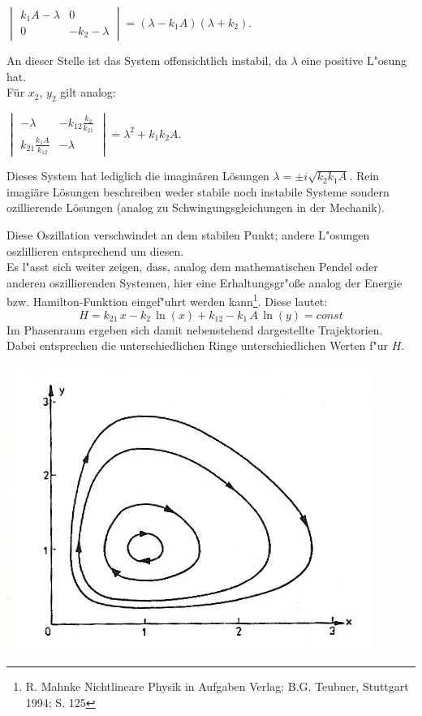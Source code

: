 \documentclass[11pt]{article}
\begin{document}
$\begin{vmatrix} k_1 A -\lambda & 0 \\ 0 & -k_2-\lambda \end{vmatrix}=(\lambda-k_1A)(\lambda+k_2)$.\\
\vspace{3mm}

An dieser Stelle ist das System offensichtlich instabil, da $\lambda$ eine positive L"osung hat.\\
Für $x_2$, $y_2$ gilt analog:\\
\vspace{3mm}

$\begin{vmatrix} -\lambda & -k_{12}\frac{k_2}{k_21} \\ k_{21}\frac{k_1 A}{k_12} & -\lambda \end{vmatrix}=\lambda^2+k_1k_2A$.\\
\vspace{3mm}

Dieses System hat lediglich die imaginären Lösungen $\lambda=\pm i\sqrt{k_2k_1A}$. Rein imagiäre Lösungen beschreiben weder stabile noch instabile Systeme sondern ozillierende Lösungen (analog zu Schwingungsgleichungen in der Mechanik).

\begin{minipage}[b]{0.6\linewidth}
Diese Oszillation verschwindet an dem stabilen Punkt; andere L"osungen oszlillieren entsprechend um diesen.\\
Es l"asst sich weiter zeigen, dass, analog dem mathematischen Pendel oder anderen oszillierenden Systemen, hier eine Erhaltungsgr"o\ss e analog der Energie bzw. Hamilton-Funktion eingef"uhrt werden kann\footnote{R. Mahnke \glqq Nichtlineare Physik in Aufgaben \grqq Verlag: B.G. Teubner, Stuttgart 1994; S. 125}. Diese lautet:
$$H=k_{21}\,x-k_2\,\ln(x)+k_{12}-k_1\,A\,\ln(y)=const$$
Im Phasenraum ergeben sich damit nebenstehend dargestellte Trajektorien. Dabei entsprechen die unterschiedlichen Ringe unterschiedlichen Werten f"ur $H$.
\end{minipage}
\begin{minipage}[b]{0.4\linewidth}
\includegraphics[width=\textwidth]{Bilder/Hamdyn.jpg}
\end{minipage}
\end{document}
